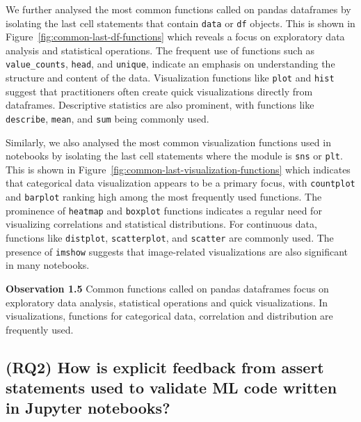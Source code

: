 \documentclass[smallextended]{svjour3}       %
\newcommand{\highlight}[1]{\begin{framed}%
  \noindent#1
\end{framed}}
\providecommand{\DIFaddbegin}{} %
\providecommand{\DIFaddend}{} %
\providecommand{\DIFdelbegin}{} %
\providecommand{\DIFdelend}{} %
\newcommand{\DIFscaledelfig}{0.5}
\newlength{\DIFdelgraphicswidth} %
\newlength{\DIFdelgraphicsheight} %
\newcommand{\DIFaddincludegraphics}[2][]{{\color{blue}\fbox{\DIFOincludegraphics[#1]{#2}}}} %
\newcommand{\DIFdelincludegraphics}[2][]{%
\sbox{\DIFdelgraphicsbox}{\DIFOincludegraphics[#1]{#2}}%
\settoboxwidth{\DIFdelgraphicswidth}{\DIFdelgraphicsbox} %
\settoboxtotalheight{\DIFdelgraphicsheight}{\DIFdelgraphicsbox} %
\scalebox{\DIFscaledelfig}{%
\parbox[b]{\DIFdelgraphicswidth}{\usebox{\DIFdelgraphicsbox}\\[-\baselineskip] \rule{\DIFdelgraphicswidth}{0em}}\llap{\resizebox{\DIFdelgraphicswidth}{\DIFdelgraphicsheight}{%
\setlength{\unitlength}{\DIFdelgraphicswidth}%
\begin{picture}(1,1)%
\thicklines\linethickness{2pt} %
{\color[rgb]{1,0,0}\put(0,0){\framebox(1,1){}}}%
{\color[rgb]{1,0,0}\put(0,0){\line( 1,1){1}}}%
{\color[rgb]{1,0,0}\put(0,1){\line(1,-1){1}}}%
\end{picture}%
}\hspace*{3pt}}} %
} %
\DeclareRobustCommand{\DIFaddbegin}{\DIFOaddbegin \let\includegraphics\DIFaddincludegraphics} %
\DeclareRobustCommand{\DIFaddend}{\DIFOaddend \let\includegraphics\DIFOincludegraphics} %
\DeclareRobustCommand{\DIFdelbegin}{\DIFOdelbegin \let\includegraphics\DIFdelincludegraphics} %
\DeclareRobustCommand{\DIFdelend}{\DIFOaddend \let\includegraphics\DIFOincludegraphics} %
\begin{document}
We further analysed the most common functions called on pandas dataframes by isolating the last cell statements that contain \lstinline{data} or \lstinline{df} objects. This is shown in Figure~\ref{fig:common-last-df-functions} which reveals a focus on exploratory data analysis and statistical operations. The frequent use of functions such as \lstinline{value_counts}, \lstinline{head}, and \lstinline{unique}, indicate an emphasis on understanding the structure and content of the data. Visualization functions like \lstinline{plot} and \lstinline{hist} suggest that practitioners often create quick visualizations directly from dataframes. Descriptive statistics are also prominent, with functions like \lstinline{describe}, \lstinline{mean}, and \lstinline{sum} being commonly used.

Similarly, we also analysed the most common visualization functions used in notebooks by isolating the last cell statements where the module is \lstinline{sns} or \lstinline{plt}. This is shown in Figure~\ref{fig:common-last-visualization-functions} which indicates that categorical data visualization appears to be a primary focus, with \lstinline{countplot} and \lstinline{barplot} ranking high among the most frequently used functions. The prominence of \lstinline{heatmap} and \lstinline{boxplot} functions indicates a regular need for visualizing correlations and statistical distributions. For continuous data, functions like \lstinline{distplot}, \lstinline{scatterplot}, and \lstinline{scatter} are commonly used. The presence of \lstinline{imshow} suggests that image-related visualizations are also significant in many notebooks.

\DIFdelbegin %
\DIFdelend \DIFaddbegin \highlight{\textbf{Observation 1.5} Common functions called on pandas dataframes focus on exploratory data analysis, statistical operations and quick visualizations. In visualizations, functions for categorical data, correlation and distribution are frequently used.}
\DIFaddend 

\subsection{(RQ2) How is explicit feedback from assert statements used to validate ML code written in Jupyter notebooks?}~\label{sec:result-explicit}
\end{document}
